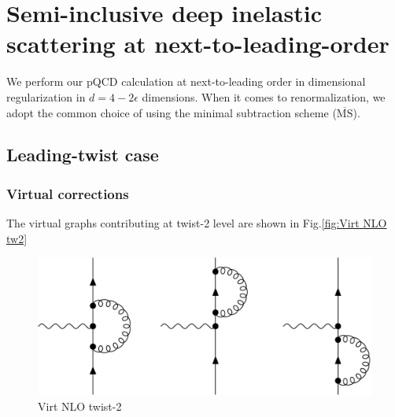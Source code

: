 \chapter{Semi-inclusive deep inelastic scattering at next-to-leading-order}

We perform our pQCD calculation at next-to-leading order in dimensional regularization in $d=4-2\epsilon$ dimensions. When it comes to renormalization, we adopt the common choice of using the minimal subtraction scheme ($\overline{\text{MS}}$).

\section{Leading-twist case}

\subsection{Virtual corrections}

The virtual graphs contributing at twist-2 level are shown in Fig.\ref{fig:Virt NLO tw2}
\begin{figure}
    \centering
    \includegraphics[width=0.75\linewidth]{fig/VirtNLOTw2.jpg}
    \caption{Virt NLO twist-2}
    \label{fig:VirtNLOTw2}
\end{figure}



